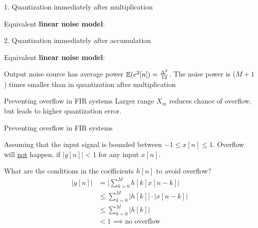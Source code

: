 \documentclass[10pt, handout]{beamer}
\begin{document}
\begin{frame}{1. Quantization immediately after multiplication}
	\begin{center}
		\def\Quantiz{1}
		\resizebox{\textwidth}{!}{}
	\end{center}

	Equivalent \textbf{linear noise model}:
	
	\vspace{-0.25cm}
	\begin{center}
		\def\Quantiz{0}
		\resizebox{\textwidth}{!}{}
	\end{center}
\end{frame}

\begin{frame}{2. Quantization immediately after accumulation}
	\begin{center}
		\def\Quantiz{1}
		\resizebox{\textwidth}{!}{}
	\end{center}
	Equivalent \textbf{linear noise model}:
	
	Output noise source has average power $\operatorname{\mathbb{E}}(e^2[n]) = \frac{\Delta^2}{12}$. The noise power is ($M+1$) times smaller than in quantization after multiplication
	\vspace{-0.5cm}
	\begin{center}
		\def\Quantiz{0}
		\resizebox{\textwidth}{!}{}
	\end{center}
\end{frame}

\begin{frame}{Preventing overflow in FIR systems}
	Larger range $X_m$ reduces chance of overflow, but leads to higher quantization error.
	 \begin{center}
		\resizebox{0.9\textwidth}{!}{}
	\end{center}
\end{frame}

\begin{frame}{Preventing overflow in FIR systems}
	
	Assuming that the input signal is bounded between $-1 \leq x[n] \leq 1$. Overflow will \underline{not} happen, if $|y[n]| < 1$ for any input $x[n]$. 
	
	What are the conditions in the coefficients $h[n]$ to avoid overflow?
	\begin{align*}
		|y[n]| &= \bigg|\sum_{k = 0}^{M} h[k]x[n-k]\bigg| \tag{modulus of convolution sum} \\
		&\leq \sum_{k = 0}^{M} |h[k]|\cdot|x[n-k]| \tag{Schwarz inequality} \\
		&\leq \sum_{k = 0}^{M} |h[k]| \tag{since $-1 \leq x[n] \leq 1$} \\
		& < 1 \implies \text{no overflow}
	\end{align*}
\end{frame}
\end{document}
